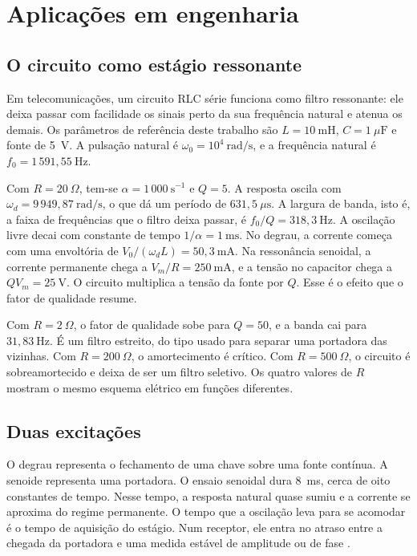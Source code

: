 \section{Aplicações em engenharia}
\label{sec:aplicacoes}

\subsection{O circuito como estágio ressonante}

Em telecomunicações, um circuito RLC série funciona como filtro ressonante: ele deixa passar com facilidade os sinais perto da sua frequência natural e atenua os demais. Os parâmetros de referência deste trabalho são \(L=10~\mathrm{mH}\), \(C=1~\mu\mathrm{F}\) e fonte de 5~V. A pulsação natural é \(\omega_0=10^{4}~\mathrm{rad/s}\), e a frequência natural é \(f_0=1\,591{,}55~\mathrm{Hz}\).

Com \(R=20~\Omega\), tem-se \(\alpha=1\,000~\mathrm{s}^{-1}\) e \(Q=5\). A resposta oscila com \(\omega_d=9\,949{,}87~\mathrm{rad/s}\), o que dá um período de \(631{,}5~\mu\mathrm{s}\). A largura de banda, isto é, a faixa de frequências que o filtro deixa passar, é \(f_0/Q=318{,}3~\mathrm{Hz}\). A oscilação livre decai com constante de tempo \(1/\alpha=1~\mathrm{ms}\). No degrau, a corrente começa com uma envoltória de \(V_0/(\omega_d L)=50{,}3~\mathrm{mA}\). Na ressonância senoidal, a corrente permanente chega a \(V_m/R=250~\mathrm{mA}\), e a tensão no capacitor chega a \(Q V_m=25~\mathrm{V}\). O circuito multiplica a tensão da fonte por \(Q\). Esse é o efeito que o fator de qualidade resume.

Com \(R=2~\Omega\), o fator de qualidade sobe para \(Q=50\), e a banda cai para \(31{,}83~\mathrm{Hz}\). É um filtro estreito, do tipo usado para separar uma portadora das vizinhas. Com \(R=200~\Omega\), o amortecimento é crítico. Com \(R=500~\Omega\), o circuito é sobreamortecido e deixa de ser um filtro seletivo. Os quatro valores de \(R\) mostram o mesmo esquema elétrico em funções diferentes.

\subsection{Duas excitações}

O degrau representa o fechamento de uma chave sobre uma fonte contínua. A senoide representa uma portadora. O ensaio senoidal dura 8~ms, cerca de oito constantes de tempo. Nesse tempo, a resposta natural quase sumiu e a corrente se aproxima do regime permanente. O tempo que a oscilação leva para se acomodar é o tempo de aquisição do estágio. Num receptor, ele entra no atraso entre a chegada da portadora e uma medida estável de amplitude ou de fase \cite{lathi2007}.

